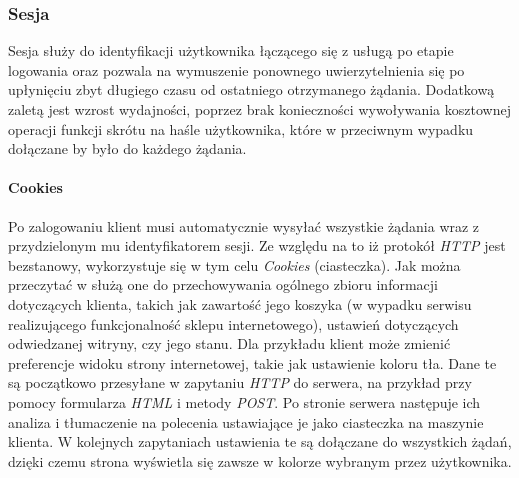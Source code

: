 \documentclass[11pt]{aghdpl}
\begin{document}

\subsubsection{Sesja}
\label{sec:sesja}

Sesja służy do identyfikacji użytkownika łączącego się z usługą po etapie logowania oraz pozwala na wymuszenie ponownego uwierzytelnienia się po upłynięciu zbyt długiego czasu od ostatniego otrzymanego żądania. Dodatkową zaletą jest wzrost wydajności, poprzez brak konieczności wywoływania kosztownej operacji funkcji skrótu na haśle użytkownika, które w przeciwnym wypadku dołączane by było do każdego żądania.

\paragraph{Cookies}
Po zalogowaniu klient musi automatycznie wysyłać wszystkie żądania wraz z przydzielonym mu identyfikatorem sesji. Ze względu na to iż protokół \emph{HTTP} jest bezstanowy, wykorzystuje się w tym celu \emph{Cookies} (ciasteczka). Jak można przeczytać w \cite{MsC} służą one do przechowywania ogólnego zbioru  informacji dotyczących klienta, takich jak zawartość jego koszyka (w wypadku serwisu realizującego funkcjonalność sklepu internetowego), ustawień dotyczących odwiedzanej witryny, czy jego stanu. Dla przykładu klient może zmienić preferencje widoku strony internetowej, takie jak ustawienie koloru tła. Dane te są początkowo przesyłane w zapytaniu \emph{HTTP} do serwera, na przykład przy pomocy formularza \emph{HTML} i metody \emph{POST}. Po stronie serwera następuje ich analiza i tłumaczenie na polecenia ustawiające je jako ciasteczka na maszynie klienta. W kolejnych zapytaniach ustawienia te są dołączane do wszystkich żądań, dzięki czemu strona wyświetla się zawsze w kolorze wybranym przez użytkownika.
\end{document}
